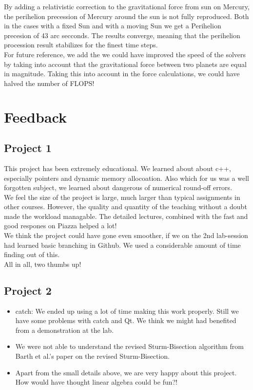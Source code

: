 \documentclass{article}
\begin{document}
By adding a relativistic correction to the gravitational force from sun on Mercury, the perihelion precession of Mercury around the sun is not fully reproduced. Both in the cases with a fixed Sun and with a moving Sun we get a Perihelion precesion of 43 arc secconds. The results converge, meaning that the perihelion procession result stabilizes for the finest time steps. \\

For future reference, we add the we could have improved the speed of the solvers by taking into account that the gravitational force between two planets are equal in magnitude. Taking this into account in the force calculations, we could have halved the number of FLOPS!


\section{Feedback}
\subsection{Project 1}
This project has been extremely educational. We learned about about c++, especially pointers and dynamic memory allocoation. Also which for us was a well forgotten subject, we learned about dangerous of numerical round-off errors. \\

We feel the size of the project is large, much larger than typical assignments in other courses. However, the quality and quantity of the teaching without a doubt made the workload managable. The detailed lectures, combined with the fast and good respones on Piazza helped a lot!\\

We think the project could have gone even smoother, if we on the 2nd lab-session had learned basic branching in Github. We used a considerable amount of time finding out of this.\\

All in all, two thumbs up!

\subsection{Project 2}
\begin{itemize}
	\item  catch: We ended up using a lot of time making this work properly. Still we have some problems with catch and Qt. We think we might had benefited from a demonstration at the lab.
	
	\item We were not able to understand the revised Sturm-Bisection algorithm from Barth et al.'s \cite{barth} paper on the revised Sturm-Bisection. 
	
	\item Apart from the small details above, we are very happy about this project. How would have thought linear algebra could be fun?!
\end{itemize}
\end{document}
